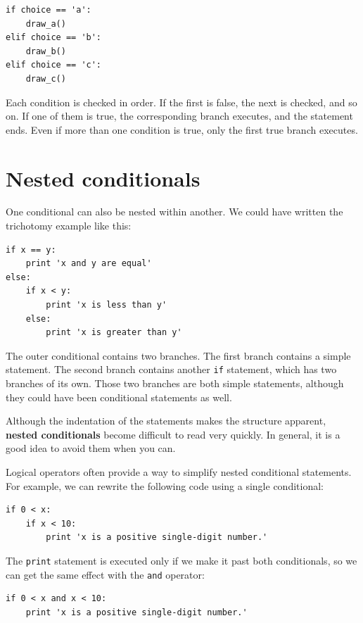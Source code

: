 \documentclass[10pt]{book}
\begin{document}


\beforeverb
\begin{verbatim}
if choice == 'a':
    draw_a()
elif choice == 'b':
    draw_b()
elif choice == 'c':
    draw_c()
\end{verbatim}
\afterverb
%
Each condition is checked in order.  If the first is false,
the next is checked, and so on.  If one of them is
true, the corresponding branch executes, and the statement
ends.  Even if more than one condition is true, only the
first true branch executes.  


\section{Nested conditionals}

One conditional can also be nested within another.  We could have
written the trichotomy example like this:

\beforeverb
\begin{verbatim}
if x == y:
    print 'x and y are equal'
else:
    if x < y:
        print 'x is less than y'
    else:
        print 'x is greater than y'
\end{verbatim}
\afterverb
%
The outer conditional contains two branches.  The
first branch contains a simple statement.  The second branch
contains another {\tt if} statement, which has two branches of its
own.  Those two branches are both simple statements,
although they could have been conditional statements as well.

Although the indentation of the statements makes the structure
apparent, {\bf nested conditionals} become difficult to read very
quickly. In general, it is a good idea to avoid them when you can.

Logical operators often provide a way to simplify nested conditional
statements.  For example, we can rewrite the following code using a
single conditional:

\beforeverb
\begin{verbatim}
if 0 < x:
    if x < 10:
        print 'x is a positive single-digit number.'
\end{verbatim}
\afterverb
%
The {\tt print} statement is executed only if we make it past both
conditionals, so we can get the same effect with the {\tt and} operator:

\beforeverb
\begin{verbatim}
if 0 < x and x < 10:
    print 'x is a positive single-digit number.'
\end{verbatim}
\afterverb
\end{document}
